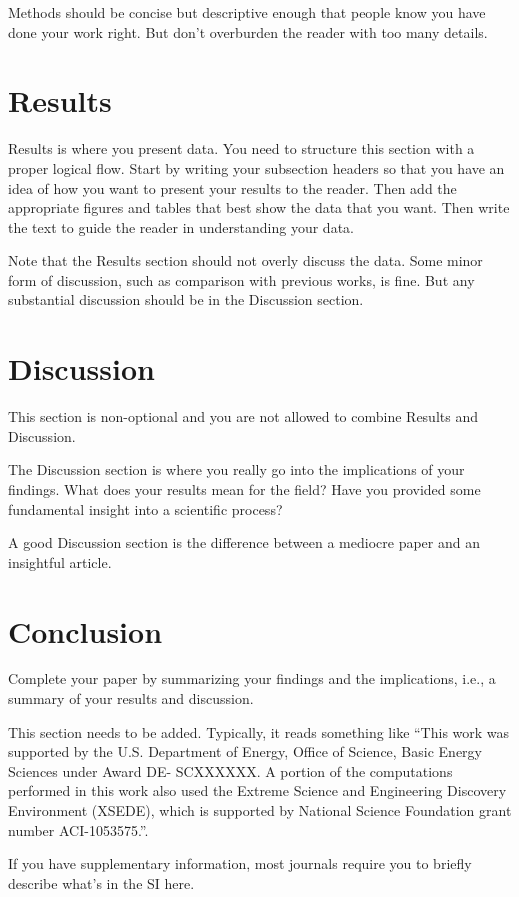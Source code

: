 \documentclass[manuscript=article]{achemso}
\begin{document}
Methods should be concise but descriptive enough that people know you have done your work right. But don't overburden the reader with too many details. 

\section{Results}

Results is where you present data. You need to structure this section with a proper logical flow. Start by writing your subsection headers so that you have an idea of how you want to present your results to the reader. Then add the appropriate figures and tables that best show the data that you want. Then write the text to guide the reader in understanding your data. 

Note that the Results section should not overly discuss the data. Some minor form of discussion, such as comparison with previous works, is fine. But any substantial discussion should be in the Discussion section.

\section{Discussion}

This section is non-optional and you are not allowed to combine Results and Discussion. 

The Discussion section is where you really go into the implications of your findings. What does your results mean for the field? Have you provided some fundamental insight into a scientific process? 

A good Discussion section is the difference between a mediocre paper and an insightful article.

\section{Conclusion}

Complete your paper by summarizing your findings and the implications, i.e., a summary of your results and discussion.

\begin{acknowledgement}

This section needs to be added. Typically, it reads something like ``This work was supported by the U.S. Department of Energy, Office of Science, Basic Energy Sciences under Award DE- SCXXXXXX. A portion of the computations performed in this work also used the Extreme Science and Engineering Discovery Environment (XSEDE), which is supported by National Science Foundation grant number ACI-1053575.''.

\end{acknowledgement}

\begin{suppinfo}
 
If you have supplementary information, most journals require you to briefly describe what's in the SI here. 

\end{suppinfo}

%

\clearpage

\listoffigures
\end{document}
